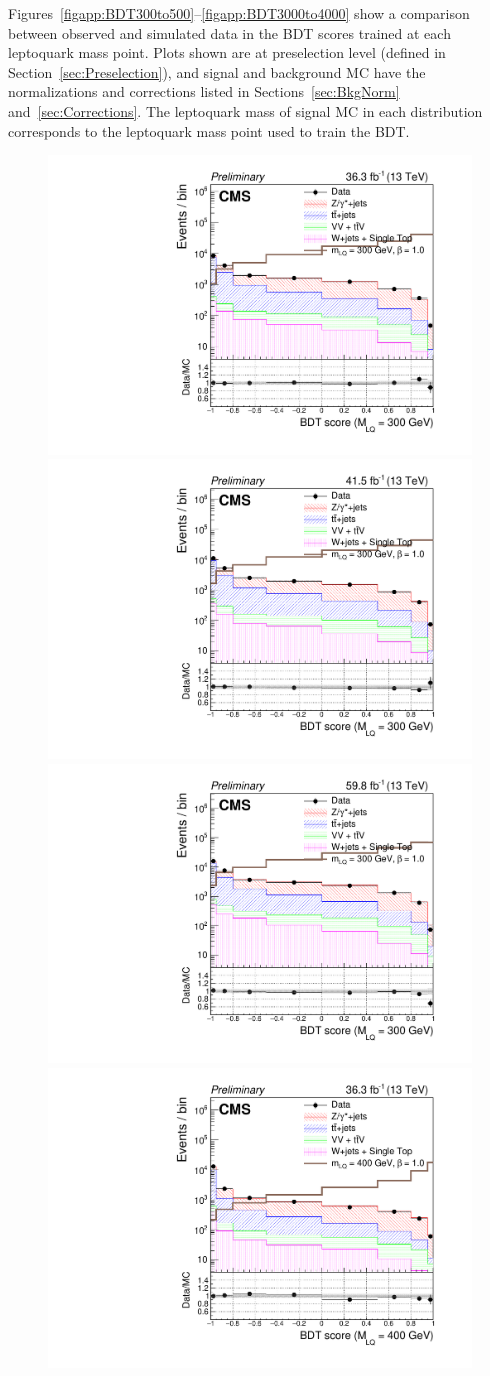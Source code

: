Figures~\ref{figapp:BDT300to500}--\ref{figapp:BDT3000to4000} show a comparison between observed and simulated data in the BDT scores trained at each leptoquark mass point. Plots shown are at preselection level (defined in Section~\ref{sec:Preselection}), and signal and background MC have the normalizations and corrections listed in Sections~\ref{sec:BkgNorm} and~\ref{sec:Corrections}. The leptoquark mass of signal MC in each distribution corresponds to the leptoquark mass point used to train the BDT.

\begin{figure}[H]
    \centering
    {\includegraphics[width=.32\textwidth]{Images/Analysis/Results_2016_Unblinded/Plots/Preselection/BasicLQ_uujj_LQToBMu_pair_uubj_BDT_discrim_M300_standard.pdf}}
    {\includegraphics[width=.32\textwidth]{Images/Analysis/Results_2017_Unblinded/Plots/Preselection/BasicLQ_uujj_LQToBMu_pair_uubj_BDT_discrim_M300_standard.pdf}}
    {\includegraphics[width=.32\textwidth]{Images/Analysis/Results_2018_Unblinded/Plots/Preselection/BasicLQ_uujj_LQToBMu_pair_uubj_BDT_discrim_M300_standard.pdf}}
    {\includegraphics[width=.32\textwidth]{Images/Analysis/Results_2016_Unblinded/Plots/Preselection/BasicLQ_uujj_LQToBMu_pair_uubj_BDT_discrim_M400_standard.pdf}}

\end{figure}

